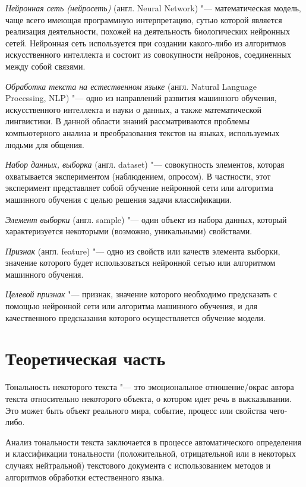 \documentclass[bachelor, och, coursework]{SCWorks}
\begin{document}
    \textit{Нейронная сеть (нейросеть)} (англ. Neural Network) "---
    математическая модель, чаще всего имеющая программную интерпретацию, сутью
    которой является реализация деятельности, похожей на деятельность
    биологических нейронных сетей. Нейронная сеть используется при создании
    какого-либо из алгоритмов искусственного интеллекта и состоит из
    совокупности нейронов, соединенных между собой связями. 

    \textit{Обработка текста на естественном языке} (англ. Natural Language\\
    Processing, NLP) "--- одно из направлений развития машинного обучения,
    искусственного интеллекта и науки о данных, а также математической
    лингвистики. В данной области знаний рассматриваются проблемы компьютерного
    анализа и преобразования текстов на языках, используемых людьми для общения.

    \textit{Набор данных, выборка} (англ. dataset) "--- совокупность элементов,
    которая охватывается экспериментом (наблюдением, опросом). В частности, этот
    эксперимент представляет собой обучение нейронной сети или алгоритма
    машинного обучения с целью решения задачи классификации.

    \textit{Элемент выборки} (англ. sample) "--- один объект из набора данных,
    который характеризуется некоторыми (возможно, уникальными) свойствами.

    \textit{Признак} (англ. feature) "--- одно из свойств или качеств элемента
    выборки, значение которого будет использоваться нейронной сетью или
    алгоритмом машинного обучения.

    \textit{Целевой признак} "--- признак, значение которого необходимо
    предсказать с помощью нейронной сети или алгоритма машинного обучения, и для
    качественного предсказания которого осуществляется обучение модели.


\section{Теоретическая часть}

    Тональность некоторого текста "--- это эмоциональное отношение/окрас автора
    текста относительно некоторого объекта, о котором идет речь в высказывании.
    Это может быть объект реального мира, событие, процесс или свойства
    чего-либо. 
    
    Анализ тональности текста заключается в процессе автоматического определения
    и классификации тональности (положительной, отрицательной или в некоторых
    случаях нейтральной) текстового документа с использованием методов и
    алгоритмов обработки естественного языка.
\end{document}
